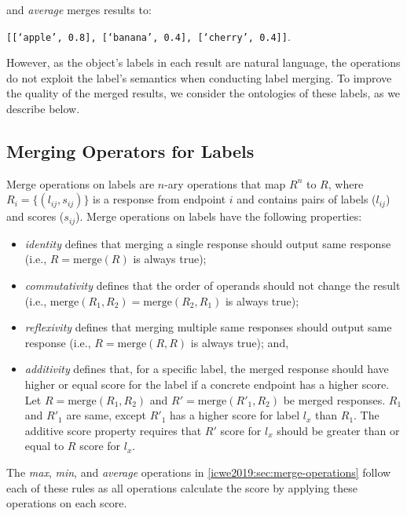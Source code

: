 \noindent
and \textit{average} merges results to:

\begin{center}
\texttt{[[`apple', 0.8], [`banana', 0.4], [`cherry', 0.4]]}.
\end{center}

\noindent
However, as the object's labels in each result are natural language, the operations do not exploit the label's semantics when conducting label merging. To improve the quality of the merged results, we consider the ontologies of these labels, as we describe below.

\subsection{Merging Operators for Labels}\label{icwe2019:sec:operator-properties}

Merge operations on labels are $n$-ary operations that map $R^{n}$ to $R$, where $R_i=\{(l_{ij}, s_{ij})\}$ is a response from endpoint $i$ and contains pairs of labels ($l_{ij}$) and scores ($s_{ij}$).
Merge operations on labels have the following properties:
 
\begin{itemize}
\item
\textit{identity} defines that merging a single response should output same response (i.e., $R=\mathrm{merge}(R)$ is always true);
\item
\textit{commutativity} defines that the order of operands should not change the result (i.e., $\mathrm{merge}(R_1, R_2) = \mathrm{merge}(R_2, R_1)$ is always true);
\item
\textit{reflexivity} defines that merging multiple same responses should output same response (i.e., $R=\mathrm{merge}(R, R)$ is always true); and,
\item
\textit{additivity} defines that, for a specific label, the merged response should have higher or equal score for the label if a concrete endpoint has a higher score. Let $R=\mathrm{merge}(R_1, R_2)$ and $R'=\mathrm{merge}(R'_1, R_2)$ be merged responses.
$R_1$ and $R'_1$ are same, except $R'_1$ has a higher score for label $l_x$ than $R_1$. The additive score property requires that $R'$ score for $l_x$ should be greater than or equal to $R$ score for $l_x$.
\end{itemize}

The \textit{max}, \textit{min}, and \textit{average} operations in \cref{icwe2019:sec:merge-operations} follow each of these rules as all operations calculate the score by applying these operations on each score.

